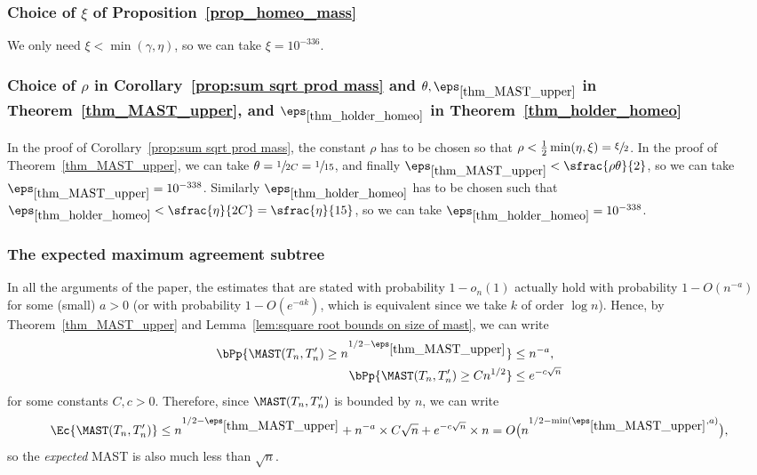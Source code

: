 \subsubsection*{Choice of $\xi$ of Proposition~\ref{prop_homeo_mass}}
We only need $\xi < \min(\gamma,\eta)$, so we can take $\xi = 10^{-336}$.
\subsubsection*{Choice of $\rho$ in Corollary~\ref{prop:sum sqrt prod mass} and $\theta, \eps_{\ref{thm_MAST_upper}}$ in Theorem~\ref{thm_MAST_upper}, and $\eps_{\ref{thm_holder_homeo}}$ in Theorem~\ref{thm_holder_homeo}}
In the proof of Corollary~\ref{prop:sum sqrt prod mass}, the constant $\rho$ has to be chosen so that $\rho < \frac{1}{2}\min(\eta,\xi)=\sfrac{\xi}{2}$. In the proof of Theorem~\ref{thm_MAST_upper}, we can take $\theta=\sfrac{1}{2C}=\sfrac{1}{15}$, and finally $\eps_{\ref{thm_MAST_upper}}< \sfrac{\rho\theta}{2}$, so we can take $\eps_{\ref{thm_MAST_upper}}=10^{-338}$.
Similarly $\eps_{\ref{thm_holder_homeo}}$ has to be chosen such that $\eps_{\ref{thm_holder_homeo}} < \sfrac{\eta}{2C}=\sfrac{\eta}{15}$, so we can take $\eps_{\ref{thm_holder_homeo}}=10^{-338}$.

\label{subsec:discussion}

\subsubsection*{The expected maximum agreement subtree}
In all the arguments of the paper, the estimates that are stated with probability $1-o_n(1)$ actually hold with probability $1-O(n^{-a})$ for some (small) $a>0$ (or with probability $1-O(e^{-ak})$, which is equivalent since we take $k$ of order $\log n$). Hence, by Theorem~\ref{thm_MAST_upper} and Lemma~\ref{lem:square root bounds on size of mast}, we can write
\begin{align*}
\bPp{\MAST(T_n,T'_n) \geq n^{1/2-\eps_{\ref{thm_MAST_upper}}}} &\leq n^{-a},\\
\bPp{\MAST(T_n,T'_n) \geq Cn^{1/2}} &\leq e^{-c\sqrt{n}}
\end{align*}
for some constants $C,c>0$. Therefore, since $\MAST(T_n,T'_n)$ is bounded by $n$, we can write
\[ \Ec{\MAST(T_n,T'_n)} \leq n^{1/2-\eps_{\ref{thm_MAST_upper}}} + n^{-a} \times C\sqrt{n} + e^{-c\sqrt{n}} \times n = O \bigl( n^{1/2-\min(\eps_{\ref{thm_MAST_upper}},a)} \bigr),\]
so the \emph{expected} MAST is also much less than $\sqrt{n}$.

